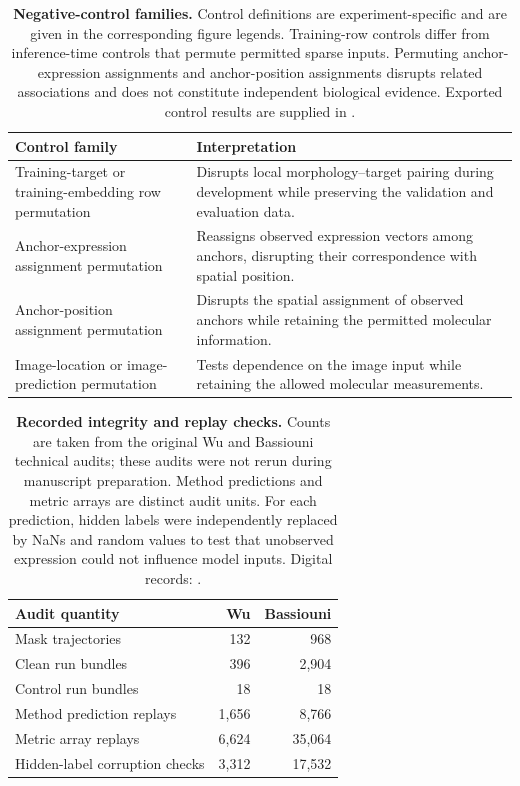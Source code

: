 \begin{table}[htbp]
\caption{\textbf{Negative-control families.} Control definitions are experiment-specific and are given in the corresponding figure legends. Training-row controls differ from inference-time controls that permute permitted sparse inputs. Permuting anchor-expression assignments and anchor-position assignments disrupts related associations and does not constitute independent biological evidence. Exported control results are supplied in \protect{}.}
\label{tab:s4}
\centering\small
\begin{tabularx}{\textwidth}{>{\RaggedRight\arraybackslash}p{}Y}\toprule
Control family & Interpretation\\\midrule
Training-target or training-embedding row permutation & Disrupts local morphology--target pairing during development while preserving the validation and evaluation data.\\
Anchor-expression assignment permutation & Reassigns observed expression vectors among anchors, disrupting their correspondence with spatial position.\\
Anchor-position assignment permutation & Disrupts the spatial assignment of observed anchors while retaining the permitted molecular information.\\
Image-location or image-prediction permutation & Tests dependence on the image input while retaining the allowed molecular measurements.\\
\bottomrule\end{tabularx}
\end{table}\clearpage
\begin{table}[htbp]
\caption{\textbf{Recorded integrity and replay checks.} Counts are taken from the original Wu and Bassiouni technical audits; these audits were not rerun during manuscript preparation. Method predictions and metric arrays are distinct audit units. For each prediction, hidden labels were independently replaced by NaNs and random values to test that unobserved expression could not influence model inputs. Digital records: \protect{}.}
\label{tab:s5}
\centering\small
\begin{tabular}{lrr}\toprule
Audit quantity & Wu & Bassiouni\\\midrule
Mask trajectories & 132 & 968\\
Clean run bundles & 396 & 2,904\\
Control run bundles & 18 & 18\\
Method prediction replays & 1,656 & 8,766\\
Metric array replays & 6,624 & 35,064\\
Hidden-label corruption checks & 3,312 & 17,532\\
\bottomrule\end{tabular}
\end{table}
